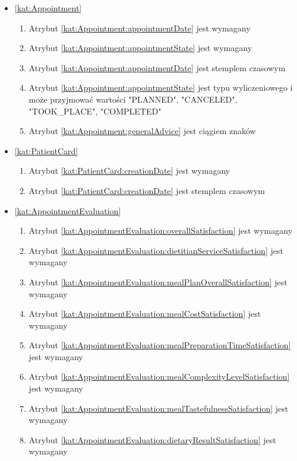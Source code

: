 \begin{itemize}[label={\textbf{Ograniczenia dla}}, wide, labelwidth=!, labelindent=0pt]
    \item\ref{kat:Appointment}
    \begin{enumerate}[label={\textbf{OGR/\protect\threedigits{\arabic{enumi}}}}, wide, labelwidth=!, align=left, leftmargin=3cm, resume]
        \item Atrybut \ref{kat:Appointment:appointmentDate} jest wymagany
        \item Atrybut \ref{kat:Appointment:appointmentState} jest wymagany

        \item Atrybut \ref{kat:Appointment:appointmentDate} jest stemplem czasowym
        \item Atrybut \ref{kat:Appointment:appointmentState} jest typu wyliczeniowego i może przyjmować wartości "PLANNED", "CANCELED", "TOOK\_PLACE", "COMPLETED"
        \item Atrybut \ref{kat:Appointment:generalAdvice} jest ciągiem znaków
    \end{enumerate}

    \item\ref{kat:PatientCard}
    \begin{enumerate}[label={\textbf{OGR/\protect\threedigits{\arabic{enumi}}}}, wide, labelwidth=!, align=left, leftmargin=3cm, resume]
        \item Atrybut \ref{kat:PatientCard:creationDate} jest wymagany

        \item Atrybut \ref{kat:PatientCard:creationDate} jest stemplem czasowym
    \end{enumerate}

    \item\ref{kat:AppointmentEvaluation}
    \begin{enumerate}[label={\textbf{OGR/\protect\threedigits{\arabic{enumi}}}}, wide, labelwidth=!, align=left, leftmargin=3cm, resume]
        \item Atrybut \ref{kat:AppointmentEvaluation:overallSatisfaction} jest wymagany
        \item Atrybut \ref{kat:AppointmentEvaluation:dietitianServiceSatisfaction} jest wymagany
        \item Atrybut \ref{kat:AppointmentEvaluation:mealPlanOverallSatisfaction} jest wymagany
        \item Atrybut \ref{kat:AppointmentEvaluation:mealCostSatisfaction} jest wymagany
        \item Atrybut \ref{kat:AppointmentEvaluation:mealPreparationTimeSatisfaction} jest wymagany
        \item Atrybut \ref{kat:AppointmentEvaluation:mealComplexityLevelSatisfaction} jest wymagany
        \item Atrybut \ref{kat:AppointmentEvaluation:mealTastefulnessSatisfaction} jest wymagany
        \item Atrybut \ref{kat:AppointmentEvaluation:dietaryResultSatisfaction} jest wymagany


\end{enumerate}
\end{itemize}
